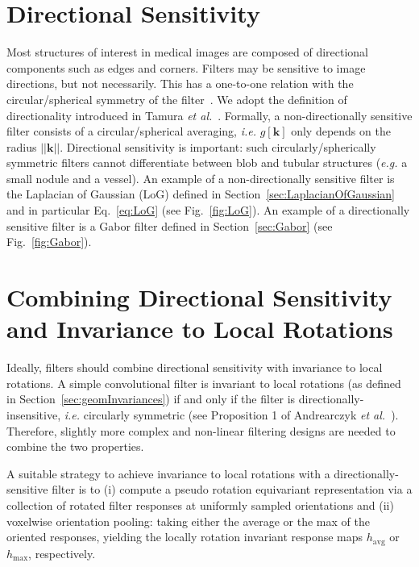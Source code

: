 \documentclass[fleqn,a4paper,oneside,openany]{book}
\begin{document}
\section{Directional Sensitivity}
%
Most structures of interest in medical images are composed of directional components such as edges and corners. Filters may be sensitive to image directions, but not necessarily. This has a one-to-one relation with the circular/spherical symmetry of the filter~\cite{Depeursinge2018}.
We adopt the definition of directionality introduced in Tamura \textit{et al.}~\cite{Tamura1978}.
Formally, a non-directionally sensitive filter consists of a circular/spherical averaging, \textit{i.e.} $g[\boldsymbol{k}]$ only depends on the radius $||\boldsymbol{k}||$.
Directional sensitivity is important: such circularly/spherically symmetric filters cannot differentiate between blob and tubular structures (\textit{e.g.} a small nodule and a vessel).
An example of a non-directionally sensitive filter is the Laplacian of Gaussian (LoG) defined in Section~\ref{sec:LaplacianOfGaussian} and in particular Eq.~\eqref{eq:LoG} (see Fig.~\ref{fig:LoG}).
An example of a directionally sensitive filter is a Gabor filter defined in Section~\ref{sec:Gabor} (see Fig.~\ref{fig:Gabor}).

\section{Combining Directional Sensitivity and Invariance to Local Rotations}\label{sec:combiningDSandRotInv}
%
Ideally, filters should combine directional sensitivity with invariance to local rotations.
A simple convolutional filter is invariant to local rotations (as defined in Section~\ref{sec:geomInvariances}) if and only if the filter is directionally-insensitive, \textit{i.e.} circularly symmetric (see Proposition 1 of Andrearczyk \emph{et al.}~\cite{AFO2019b}).
Therefore, slightly more complex and non-linear filtering designs are needed to combine the two properties.

A suitable strategy to achieve invariance to local rotations with a directionally-sensitive filter is to (i) compute a pseudo rotation equivariant representation via a collection of rotated filter responses at uniformly sampled orientations and (ii) voxelwise orientation pooling: taking either the average or the max of the oriented responses, yielding the locally rotation invariant response maps $h_{\text{avg}}$ or $h_{\text{max}}$, respectively.
\end{document}

